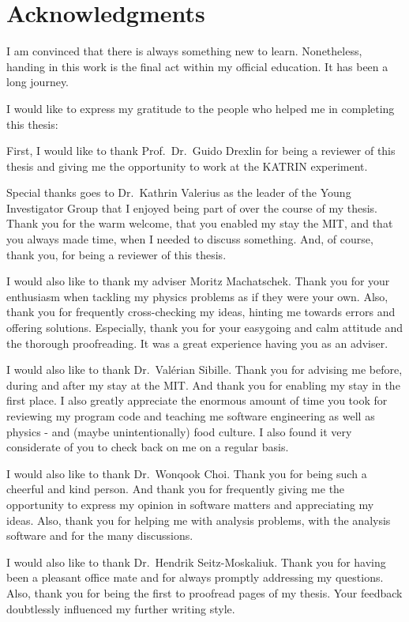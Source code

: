 \chapter*{Acknowledgments}
I am convinced that there is always something new to learn. Nonetheless, handing in this work is the final act within my official education. It has been a long journey. 

I would like to express my gratitude to the people who helped me in completing this thesis:

First, I would like to thank Prof.~Dr.~Guido Drexlin for being a reviewer of this thesis and giving me the opportunity to work at the KATRIN experiment.

Special thanks goes to Dr.~Kathrin Valerius as the leader of the Young Investigator Group that I enjoyed being part of over the course of my thesis. Thank you for the warm welcome, that you enabled my stay the MIT, and that you always made time, when I needed to discuss something. And, of course, thank you, for being a reviewer of this thesis. 

I would also like to thank my adviser Moritz Machatschek. Thank you for your enthusiasm when tackling my physics problems as if they were your own. Also, thank you for frequently cross-checking my ideas, hinting me towards errors and offering solutions. Especially, thank you for your easygoing and calm attitude and the thorough proofreading. It was a great experience having you as an adviser.

I would also like to thank Dr.~Valérian Sibille. Thank you for advising me before, during and after my stay at the MIT. And thank you for enabling my stay in the first place. I also greatly appreciate the enormous amount of time you took for reviewing my program code and teaching me software engineering as well as physics - and (maybe unintentionally) food culture. I also found it very considerate of you to check back on me on a regular basis.

I would also like to thank Dr.~Wonqook Choi. Thank you for being such a cheerful and kind person. And thank you for frequently giving me the opportunity to express my opinion in software matters and appreciating my ideas. Also, thank you for helping me with analysis problems, with the analysis software and for the many discussions.

I would also like to thank Dr.~Hendrik Seitz-Moskaliuk. Thank you for having been a pleasant office mate and for always promptly addressing my questions. Also, thank you for being the first to proofread pages of my thesis. Your feedback doubtlessly influenced my further writing style.

